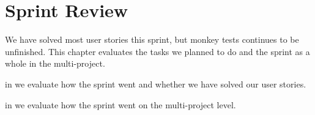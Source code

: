 \chapter{Sprint Review}\label{chap:sprint2_end}
We have solved most user stories this sprint, but monkey tests continues to be unfinished. This chapter evaluates the tasks we planned to do and the sprint as a whole in the multi-project.

\begin{chapterorganization}
  \item in  we evaluate how the sprint went and whether we have solved our user stories.
  \item in  we evaluate how the sprint went on the multi-project level.
\end{chapterorganization}

